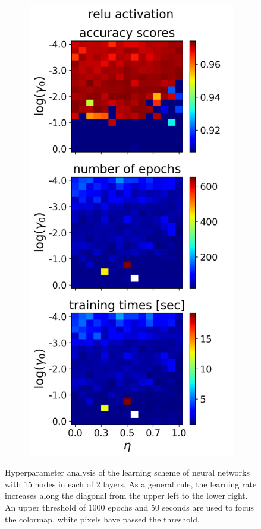 \documentclass[nofootinbib,reprint,english]{revtex4-1}
\begin{document}
\begin{figure}[h!]
\begin{subfigure}{0.32\textwidth}
	\end{subfigure}
	~
	\begin{subfigure}{0.32\textwidth}
	\centering
	\includegraphics[scale=0.38]{../results/NN/img/gridsearch2_relu2.png}
	\end{subfigure}	
\caption{Hyperparameter analysis of the learning scheme of neural networks with 15 nodes in each of  2 layers. As a general rule, the learning rate increases along the diagonal from the upper left to the lower right. An upper threshold of 1000 epochs and 50 seconds are used to focus the colormap, white pixels have passed the threshold.}
\label{fig:NNgridsearch2_2}
\end{figure}
\end{document}
